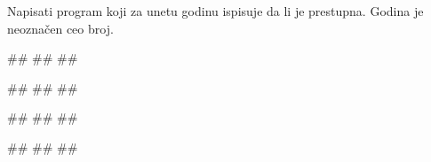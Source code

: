 \begin{Exercise}[label=KT_NG_07] 
Napisati program koji za unetu godinu ispisuje da li je prestupna. 
Godina je neoznačen ceo broj.

\begin{miditest}
\begin{upotreba}{1}
#\naslovInt#
##
##
\end{upotreba}
\end{miditest}
\begin{miditest}
\begin{upotreba}{2}
#\naslovInt#
##
##
\end{upotreba}
\end{miditest}

\begin{miditest}
\begin{upotreba}{3}
#\naslovInt#
##
##
\end{upotreba}
\end{miditest}
\begin{miditest}
\begin{upotreba}{4}
#\naslovInt#
##
##
\end{upotreba}
\end{miditest}
\end{Exercise}
\ifresenja
 \begin{Answer}[ref=KT_NG_07]
\end{Answer}
\fi



